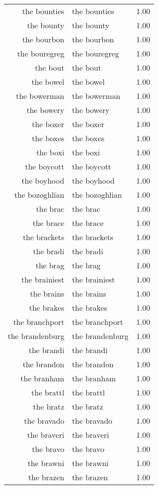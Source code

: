 \begin{table}[ht]
\begin{tabular}{rlr}
  the bounties & the bounties & 1.00 \\ 
  the bounty & the bounty & 1.00 \\ 
  the bourbon & the bourbon & 1.00 \\ 
  the bouregreg & the bouregreg & 1.00 \\ 
  the bout & the bout & 1.00 \\ 
  the bowel & the bowel & 1.00 \\ 
  the bowerman & the bowerman & 1.00 \\ 
  the bowery & the bowery & 1.00 \\ 
  the boxer & the boxer & 1.00 \\ 
  the boxes & the boxes & 1.00 \\ 
  the boxi & the boxi & 1.00 \\ 
  the boycott & the boycott & 1.00 \\ 
  the boyhood & the boyhood & 1.00 \\ 
  the bozoghlian & the bozoghlian & 1.00 \\ 
  the brac & the brac & 1.00 \\ 
  the brace & the brace & 1.00 \\ 
  the brackets & the brackets & 1.00 \\ 
  the bradi & the bradi & 1.00 \\ 
  the brag & the brag & 1.00 \\ 
  the brainiest & the brainiest & 1.00 \\ 
  the brains & the brains & 1.00 \\ 
  the brakes & the brakes & 1.00 \\ 
  the branchport & the branchport & 1.00 \\ 
  the brandenburg & the brandenburg & 1.00 \\ 
  the brandi & the brandi & 1.00 \\ 
  the brandon & the brandon & 1.00 \\ 
  the branham & the branham & 1.00 \\ 
  the brattl & the brattl & 1.00 \\ 
  the bratz & the bratz & 1.00 \\ 
  the bravado & the bravado & 1.00 \\ 
  the braveri & the braveri & 1.00 \\ 
  the bravo & the bravo & 1.00 \\ 
  the brawni & the brawni & 1.00 \\ 
  the brazen & the brazen & 1.00 \\ 

\end{tabular}
\end{table}
